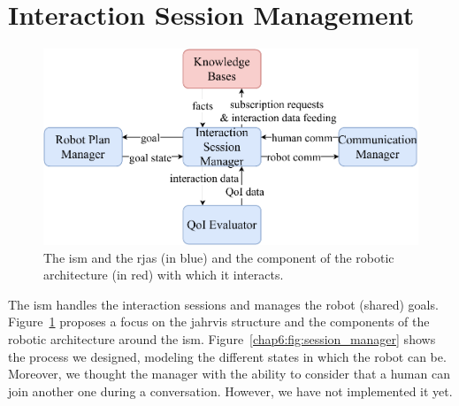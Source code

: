 \documentclass[a4paper,11pt,twoside]{StyleThese}
\begin{document}
\thispagestyle{example}

\section{Interaction Session Management} 

\begin{figure}[!htb]
	\centering
	\includegraphics[width=0.7\linewidth]{figures/chapter2/session_manager_zoom.pdf}
	\caption{The \acrlong{ism} and the \acrshort{rja}s (in blue) and the component of the robotic architecture (in red) with which it interacts.}
	\label{chap6:fig:session_manager_zoom}
\end{figure}

The \acrfull{ism} handles the interaction sessions and manages the robot (shared) goals. Figure~\ref{chap6:fig:session_manager_zoom} proposes a focus on the \acrshort{jahrvis} structure and the components of the robotic architecture around the \acrshort{ism}. Figure~\ref{chap6:fig:session_manager} shows the process we designed, modeling the different states in which the robot can be. Moreover, we thought the manager with the ability to consider that a human can join another one during a conversation. However, we have not implemented it yet.
\end{document}
